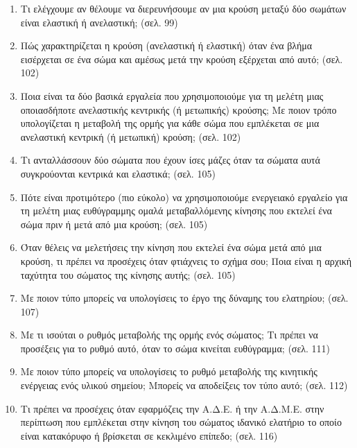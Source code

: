 \documentclass{article}
\begin{document}
\begin{enumerate}
      \item
            Τι ελέγχουμε αν θέλουμε να διερευνήσουμε αν μια κρούση μεταξύ δύο σωμάτων είναι ελαστική ή ανελαστική; (σελ. 99)

      \item
            Πώς χαρακτηρίζεται η κρούση (ανελαστική ή ελαστική) όταν ένα βλήμα εισέρχεται σε ένα σώμα και αμέσως μετά την κρούση εξέρχεται από αυτό; (σελ. 102)

      \item
            Ποια είναι τα δύο βασικά εργαλεία που χρησιμοποιούμε για τη μελέτη μιας οποιασδήποτε ανελαστικής κεντρικής (ή μετωπικής) κρούσης; Με ποιον τρόπο υπολογίζεται η μεταβολή της ορμής για κάθε σώμα που εμπλέκεται σε μια ανελαστική κεντρική (ή μετωπική) κρούση; (σελ. 102)

      \item
            Τι ανταλλάσσουν δύο σώματα που έχουν ίσες μάζες όταν τα σώματα αυτά συγκρούονται κεντρικά και ελαστικά; (σελ. 105)

      \item
            Πότε είναι προτιμότερο (πιο εύκολο) να χρησιμοποιούμε ενεργειακό εργαλείο για τη μελέτη μιας ευθύγραμμης ομαλά μεταβαλλόμενης κίνησης που εκτελεί ένα σώμα πριν ή μετά από μια κρούση; (σελ. 105)

      \item
            Όταν θέλεις να μελετήσεις την κίνηση που εκτελεί ένα σώμα μετά από μια κρούση, τι πρέπει να προσέχεις όταν φτιάχνεις το σχήμα σου; Ποια είναι η αρχική ταχύτητα του σώματος της κίνησης αυτής; (σελ. 105)

      \item
            Με ποιον τύπο μπορείς να υπολογίσεις το έργο της δύναμης του ελατηρίου; (σελ. 107)

      \item
            Με τι ισούται ο ρυθμός μεταβολής της ορμής ενός σώματος; Τι πρέπει να προσέξεις για το ρυθμό αυτό, όταν το σώμα κινείται ευθύγραμμα; (σελ. 111)

      \item
            Με ποιον τύπο μπορείς να υπολογίσεις το ρυθμό μεταβολής της κινητικής ενέργειας ενός υλικού σημείου; Μπορείς να αποδείξεις τον τύπο αυτό; (σελ. 112)

      \item
            Τι πρέπει να προσέχεις όταν εφαρμόζεις την Α.Δ.Ε. ή την Α.Δ.Μ.Ε. στην περίπτωση που εμπλέκεται στην κίνηση του σώματος ιδανικό ελατήριο το οποίο είναι κατακόρυφο ή βρίσκεται σε κεκλιμένο επίπεδο; (σελ. 116)


\end{enumerate}
\end{document}
